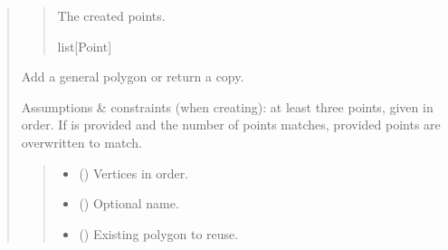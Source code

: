 \documentclass[letterpaper,10pt,english]{sphinxmanual}
\begin{document}
\begin{quote}
\begin{fulllineitems}
\begin{fulllineitems}
\begin{quote}
\begin{description}
\sphinxAtStartPar
The created points.

\sphinxAtStartPar
list{[}Point{]}

\end{description}\end{quote}

\end{fulllineitems}


\begin{fulllineitems}
\label{\detokenize{pygeox:pygeox.add_objects.AddNamespace.polygon}}
\pysigstartsignatures
\pysiglinewithargsret
{}
{\sphinxparamcomma {}\sphinxparamcomma {}}
{}
\pysigstopsignatures
\sphinxAtStartPar
Add a general polygon or return a copy.

\sphinxAtStartPar
Assumptions \& constraints (when creating):
at least three points, given in order. If  is provided and the
number of points matches, provided points are overwritten to match.
\begin{quote}\begin{description}
\begin{itemize}
\item {} 
\sphinxAtStartPar
{} () \textendash{} Vertices in order.

\item {} 
\sphinxAtStartPar
{} (\sphinxstyleliteralemphasis{\sphinxupquote{ | }}) \textendash{} Optional name.

\item {} 
\sphinxAtStartPar
{} (\sphinxstyleliteralemphasis{\sphinxupquote{ | }}) \textendash{} Existing polygon to reuse.

\end{itemize}


\end{description}
\end{quote}
\end{fulllineitems}
\end{fulllineitems}
\end{quote}
\end{document}
